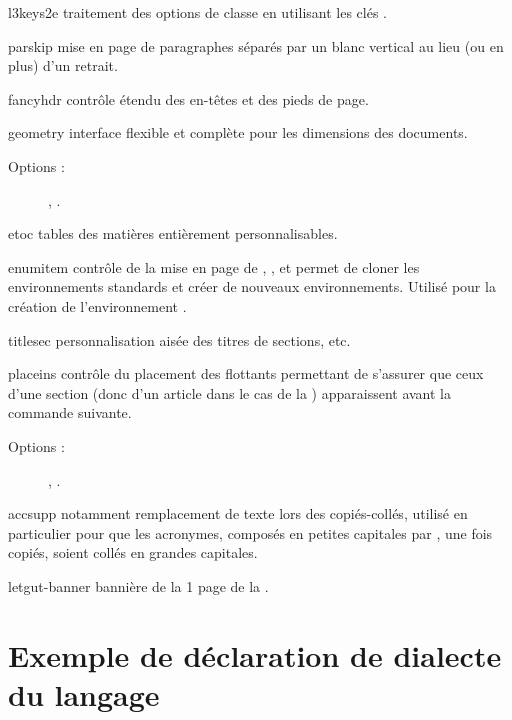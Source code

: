 \documentclass{letgut}
\begin{document}
\begin{ctannews}
\item[l3keys2e] traitement  des options de classe en utilisant
  les clés .
\item[parskip] mise en page de paragraphes séparés par un blanc vertical au lieu
  (ou en plus) d'un retrait.
\item[fancyhdr] contrôle étendu des en-têtes et des pieds de page.
\item[geometry] interface flexible et complète pour les dimensions des
  documents.
  \begin{description}
  \item[Options :] , .
  \end{description}
\item[etoc] tables des matières entièrement personnalisables.
\item[enumitem] contrôle de la mise en page de ,
  ,  et permet de
  cloner les environnements standards et créer de nouveaux
  environnements. Utilisé pour la création de l'environnement .
\item[titlesec] personnalisation aisée des titres de sections, etc.
\item[placeins] contrôle du placement des flottants permettant de s'assurer que
  ceux d'une section (donc d'un article dans le cas de la )
  apparaissent avant la commande  suivante.
  \begin{description}
  \item[Options :] , .
  \end{description}
\item[accsupp] notamment remplacement de texte lors des copiés-collés, utilisé
  en particulier pour que les acronymes, composés en petites capitales par
  , une fois copiés, soient collés en grandes capitales.
\item[letgut-banner] bannière de la 1\iere{} page de la .
\end{ctannews}

\section{Exemple de déclaration de dialecte du langage }
\label{sec:exemple-de-decl}
\end{document}

